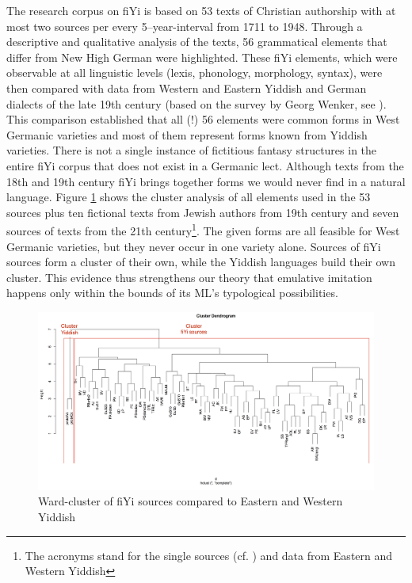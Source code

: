 \documentclass[output=paper]{LSP/langsci}
\begin{document}
The research corpus on fiYi is based on 53 texts of Christian authorship with at most two sources per every 5–year-interval from 1711 to 1948. Through a descriptive and qualitative analysis of the texts, 56 grammatical elements that differ from New High German were highlighted. These fiYi elements, which were observable at all linguistic levels (lexis, phonology, morphology, syntax), were then compared with data from Western and Eastern Yiddish and German dialects of the late 19th century (based on the survey by Georg Wenker, see \citealt{wenker_schriften_2013}).\\
This comparison established that all (!) 56 elements were common forms in West Germanic varieties and most of them represent forms known from Yiddish varieties. There is not a single instance of fictitious fantasy structures in the entire fiYi corpus that does not exist in a Germanic lect. Although texts from the 18th and 19th century fiYi brings together forms we would never find in a natural language. Figure \ref{RplotWJOJALLE} shows the cluster analysis of all elements used in the 53 sources plus ten fictional texts from Jewish authors from 19th century and seven sources of texts from the 21th century\footnote{The acronyms stand for the single sources (cf. \cite{schafer_imitationen_2014}) and data from Eastern and Western Yiddish}. The given forms are all feasible for West Germanic varieties, but they never occur in one variety alone. Sources of fiYi sources form a cluster of their own, while the Yiddish languages build their own cluster. This evidence thus strengthens our theory that emulative imitation happens only within the bounds of its ML’s typological possibilities.
 
 \begin{figure}[h!]
\includegraphics[width=\textwidth]{illustrations/schaf_etal_fig5}%
		\caption{\label{RplotWJOJALLE} Ward-cluster of fiYi sources compared to Eastern and Western Yiddish}
	\end{figure}
\FloatBarrier
  
\end{document}
